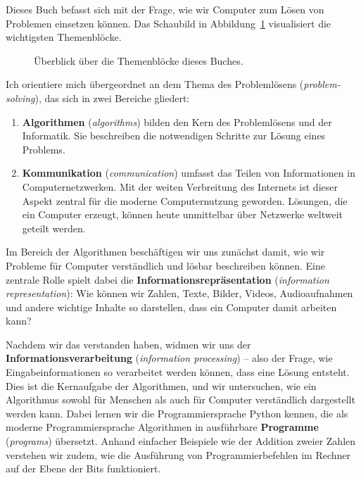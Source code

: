 \documentclass[
  letterpaper,
  DIV=11]{scrreprt}
\begin{document}

Dieses Buch befasst sich mit der Frage, wie wir Computer zum Lösen von
Problemen einsetzen können. Das Schaubild in
Abbildung~\ref{fig-advance-organizer-dap} visualisiert die wichtigsten
Themenblöcke.

\begin{figure}


\caption{\label{fig-advance-organizer-dap}Überblick über die
Themenblöcke dieses Buches.}

\end{figure}%

Ich orientiere mich übergeordnet an dem Thema des Problemlösens
(\emph{problem-solving}), das sich in zwei Bereiche gliedert:

\begin{enumerate}
\def\labelenumi{\arabic{enumi}.}
\item
  \textbf{Algorithmen} (\emph{algorithms}) bilden den Kern des
  Problemlösens und der Informatik. Sie beschreiben die notwendigen
  Schritte zur Lösung eines Problems.
\item
  \textbf{Kommunikation} (\emph{communication}) umfasst das Teilen von
  Informationen in Computernetzwerken. Mit der weiten Verbreitung des
  Internets ist dieser Aspekt zentral für die moderne Computernutzung
  geworden. Lösungen, die ein Computer erzeugt, können heute unmittelbar
  über Netzwerke weltweit geteilt werden.
\end{enumerate}

Im Bereich der Algorithmen beschäftigen wir uns zunächst damit, wie wir
Probleme für Computer verständlich und lösbar beschreiben können. Eine
zentrale Rolle spielt dabei die \textbf{Informationsrepräsentation
}(\emph{information representation}): Wie können wir Zahlen, Texte,
Bilder, Videos, Audioaufnahmen und andere wichtige Inhalte so
darstellen, dass ein Computer damit arbeiten kann?

Nachdem wir das verstanden haben, widmen wir uns der
\textbf{Informationsverarbeitung }(\emph{information processing}) --
also der Frage, wie Eingabeinformationen so verarbeitet werden können,
dass eine Lösung entsteht. Dies ist die Kernaufgabe der Algorithmen, und
wir untersuchen, wie ein Algorithmus sowohl für Menschen als auch für
Computer verständlich dargestellt werden kann. Dabei lernen wir die
Programmiersprache Python kennen, die als moderne Programmiersprache
Algorithmen in ausführbare \textbf{Programme} (\emph{programs})
übersetzt. Anhand einfacher Beispiele wie der Addition zweier Zahlen
verstehen wir zudem, wie die Ausführung von Programmierbefehlen im
Rechner auf der Ebene der Bits funktioniert.
\end{document}
